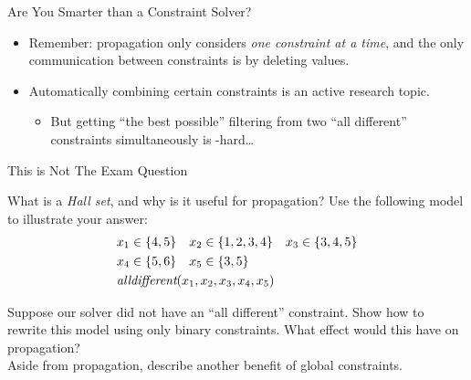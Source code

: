 \documentclass{beamer}
\begin{document}
\begin{frame}{Are You Smarter than a Constraint Solver?}
     {
        \begin{center}\end{center}
    }

     {
        \begin{itemize}
            \item Remember: propagation only considers \emph{one constraint at a time}, and the only
                communication between constraints is by deleting values.

            \item Automatically combining certain constraints is an active research topic.
                \begin{itemize}
                    \item But getting ``the best possible'' filtering from two ``all different''
                        constraints simultaneously is \NP-hard\ldots
                \end{itemize}
        \end{itemize}
    }
\end{frame}

\begin{frame}{This is Not The Exam Question}

    What is a \emph{Hall set}, and why is it useful for propagation? Use the following model to
    illustrate your answer:
    \begin{align*}
        & x_1 \in \{ 4, 5 \}   && x_2 \in \{ 1, 2, 3, 4 \}  && x_3 \in \{ 3, 4, 5 \} \\
        & x_4 \in \{ 5, 6 \}   && x_5 \in \{ 3, 5 \} \\
        & \mathrlap{\textit{alldifferent}( x_1, x_2, x_3, x_4, x_5 )}
    \end{align*}

    Suppose our solver did not have an ``all different'' constraint. Show how to rewrite this model
    using only binary constraints.  What effect would this have on propagation? \\[0.2cm]

    Aside from propagation, describe another benefit of global constraints.

\end{frame}
\end{document}
